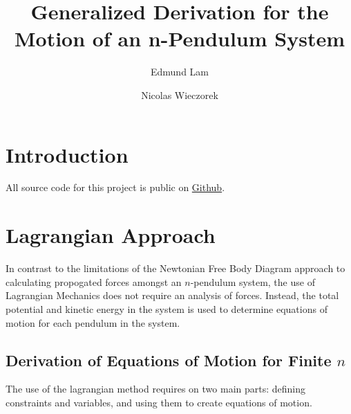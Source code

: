 \documentclass{article}
\title{Generalized Derivation for the Motion of an n-Pendulum System}
\author{Edmund Lam \and Nicolas Wieczorek}
\begin{document}
\begin{titlepage}
	\maketitle
	\thispagestyle{empty}
\end{titlepage}
\newpage
  \tableofcontents
\newpage

\section{Introduction}
All source code for this project is public on \href{https://github.com/UnsignedByte/n-pendulums}{Github}.

\section{Lagrangian Approach}
In contrast to the limitations of the Newtonian Free Body Diagram approach to calculating propogated forces amongst an $n$-pendulum system, the use of Lagrangian Mechanics does not require an analysis of forces. Instead, the total potential and kinetic energy in the system is used to determine equations of motion for each pendulum in the system.
\subsection{Derivation of Equations of Motion for Finite \texorpdfstring{$n$}{n}}
The use of the lagrangian method requires on two main parts: defining constraints and variables, and using them to create equations of motion.
\end{document}
